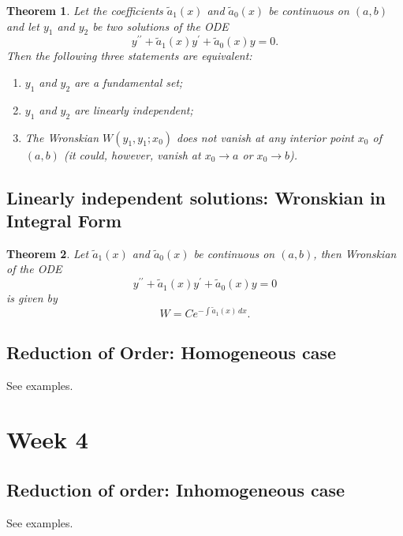 \documentclass{article}
\newtheorem{theorem}{Theorem}
\begin{document}
\begin{theorem}
    Let the coefficients $\tilde{a}_1(x)$ and $\tilde{a}_0(x)$ be continuous on $(a,b)$ and let $y_1$ and $y_2$ be two solutions of the ODE
    \begin{equation}
        y^{\prime\prime}+\tilde{a}_1(x)y^\prime + \tilde{a}_0(x)y=0.
    \end{equation}
    Then the following three statements are equivalent:
    \begin{enumerate}
        \item $y_1$ and $y_2$ are a fundamental set;
        \item $y_1$ and $y_2$ are linearly independent;
        \item The Wronskian $ W(y_1,y_1;x_0) $ does not vanish at any interior point $x_0$ of $(a,b)$ (it could, however, vanish at $x_0\to a$ or $x_0\to b$).
    \end{enumerate}
\end{theorem}


\subsection{Linearly independent solutions: Wronskian in Integral Form}
\begin{theorem}
    Let $\tilde{a}_1(x)$ and $\tilde{a}_0(x)$ be continuous on $(a,b)$, then Wronskian of the ODE
    \begin{equation}
        y^{\prime\prime}+\tilde{a}_1(x)y^\prime + \tilde{a}_0(x)y=0
    \end{equation}
    is given by
    \begin{equation}
        W = Ce^{-\int \tilde{a}_1(x)\, dx}.
    \end{equation}
\end{theorem}


\subsection{Reduction of Order: Homogeneous case}
See examples.


\section{Week 4}
\subsection{Reduction of order: Inhomogeneous case}
See examples.
\end{document}
